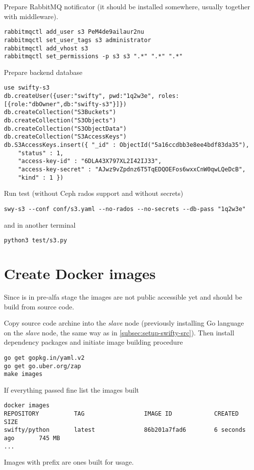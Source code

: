 Prepare RabbitMQ notificator (it should be installed
somewhere, usually together with middleware).

\begin{lstlisting}
rabbitmqctl add_user s3 PeM4de9ailaur2nu
rabbitmqctl set_user_tags s3 administrator
rabbitmqctl add_vhost s3
rabbitmqctl set_permissions -p s3 s3 ".*" ".*" ".*"
\end{lstlisting}

Prepare backend database

\begin{lstlisting}
use swifty-s3
db.createUser({user:"swifty", pwd:"1q2w3e", roles:[{role:"dbOwner",db:"swifty-s3"}]})
db.createCollection("S3Buckets")
db.createCollection("S3Objects")
db.createCollection("S3ObjectData")
db.createCollection("S3AccessKeys")
db.S3AccessKeys.insert({ "_id" : ObjectId("5a16ccdbb3e8ee4bdf83da35"),
	"status" : 1,
	"access-key-id" : "6DLA43X797XL2I42IJ33",
	"access-key-secret" : "AJwz9vZpdnz6T5TqEDQOEFos6wxxCnW0qwLQeDcB",
	"kind" : 1 })
\end{lstlisting}

Run test (without Ceph rados support and without secrets)

\begin{lstlisting}
swy-s3 --conf conf/s3.yaml --no-rados --no-secrets --db-pass "1q2w3e"
\end{lstlisting}

and in another terminal

\begin{lstlisting}
python3 test/s3.py
\end{lstlisting}

\section{Create Docker images}
\label{sec:setup-images}

Since  is in pre-alfa stage the images are not public
accessible yet and should be build from  source code.

Copy source code archine into the \emph{slave} node (previously
installing Go language on the \emph{slave} node, the same way
as in \ref{subsec:setup-swifty-src}). Then install dependency packages
and initiate image building procedure

\begin{lstlisting}
go get gopkg.in/yaml.v2
go get go.uber.org/zap
make images
\end{lstlisting}

If everything passed fine list the images built

\begin{lstlisting}
docker images
REPOSITORY          TAG                 IMAGE ID            CREATED             SIZE
swifty/python       latest              86b201a7fad6        6 seconds ago       745 MB
...
\end{lstlisting}

Images with  prefix are ones built for  usage.
